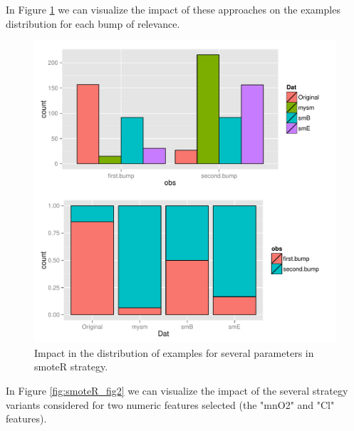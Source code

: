 \documentclass[10pt,a4paper]{article}\usepackage[]{graphicx}\usepackage[]{color}
\makeatletter
\def\maxwidth{ %
  \ifdim\Gin@nat@width>\linewidth
    \linewidth
  \else
    \Gin@nat@width
  \fi
}
\newenvironment{knitrout}{}{} %
\makeatother
\begin{document}
In Figure \ref{fig:smoteR_1bar} we can visualize the impact of these approaches on the examples distribution for each bump of relevance.

\begin{knitrout}\footnotesize
{}\color{fgcolor}\begin{figure}

{\centering \includegraphics[width=\maxwidth,height=0.5\textheight]{figures/UBL-smoteR_1bar-1} 

}

\caption[Impact in the distribution of examples for several parameters in smoteR strategy]{Impact in the distribution of examples for several parameters in smoteR strategy. }\label{fig:smoteR_1bar}
\end{figure}


\end{knitrout}

In Figure \ref{fig:smoteR_fig2} we can visualize the impact of the several strategy variants considered for two numeric features selected (the "mnO2" and "Cl" features).
\end{document}
